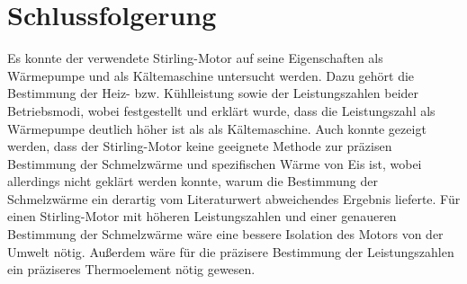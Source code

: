 \documentclass[
	a4paper,
	12pt,
	pagesize,
	ngerman
]{scrartcl}
\begin{document}
	\section{Schlussfolgerung}
	Es konnte der verwendete Stirling-Motor auf seine Eigenschaften als Wärmepumpe und als Kältemaschine untersucht werden.
	Dazu gehört die Bestimmung der Heiz- bzw. Kühlleistung sowie der Leistungszahlen beider Betriebsmodi, wobei festgestellt und erklärt wurde, dass die Leistungszahl als Wärmepumpe deutlich höher ist als als Kältemaschine.
	Auch konnte gezeigt werden, dass der Stirling-Motor keine geeignete Methode zur präzisen Bestimmung der Schmelzwärme und spezifischen Wärme von Eis ist, wobei allerdings nicht geklärt werden konnte, warum die Bestimmung der Schmelzwärme ein derartig vom Literaturwert abweichendes Ergebnis lieferte.
	Für einen Stirling-Motor mit höheren Leistungszahlen und einer genaueren Bestimmung der Schmelzwärme wäre eine bessere Isolation des Motors von der Umwelt nötig.
	Außerdem wäre für die präzisere Bestimmung der Leistungszahlen ein präziseres Thermoelement nötig gewesen.
	\printbibliography
\end{document}
